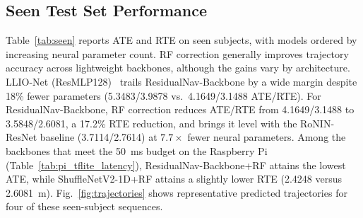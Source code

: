 \documentclass[10pt,conference,letterpaper]{IEEEtran}
\begin{document}
\begin{table}[htbp]
\caption{Raspberry Pi 3 B+ Profiling of the Base TFLite Backbones (Mean $\pm$ Std over 50 Runs)}
\label{tab:pi_tflite_latency}
\centering
\scriptsize
{}
\end{table}



\subsection{Seen Test Set Performance}


Table~\ref{tab:seen} reports ATE and RTE on seen subjects, with models ordered by increasing neural parameter count. RF correction generally improves trajectory accuracy across lightweight backbones, although the gains vary by architecture. LLIO-Net (ResMLP128)~\cite{llio2022} trails ResidualNav-Backbone by a wide margin despite 18\% fewer parameters (5.3483/3.9878 vs.\ 4.1649/3.1488 ATE/RTE). For ResidualNav-Backbone, RF correction reduces ATE/RTE from 4.1649/3.1488 to 3.5848/2.6081, a 17.2\% RTE reduction, and brings it level with the RoNIN-ResNet baseline (3.7114/2.7614) at $7.7\times$ fewer neural parameters. Among the backbones that meet the 50~ms budget on the Raspberry Pi (Table~\ref{tab:pi_tflite_latency}), ResidualNav-Backbone+RF attains the lowest ATE, while ShuffleNetV2-1D+RF attains a slightly lower RTE (2.4248 versus 2.6081~m). Fig.~\ref{fig:trajectories} shows representative predicted trajectories for four of these seen-subject sequences.
\end{document}

